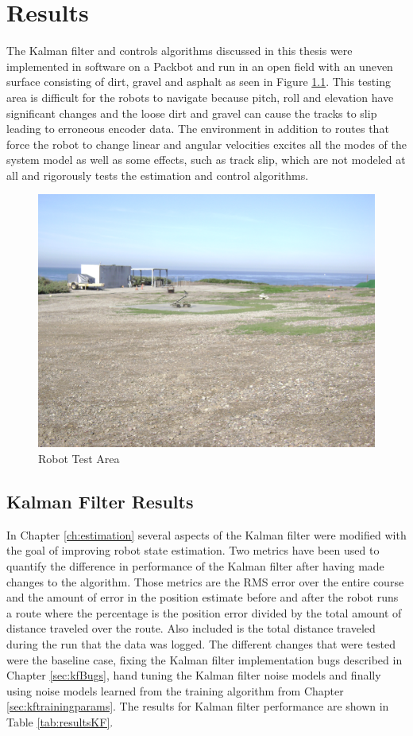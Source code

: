 \chapter{Results}
\label{ch:results}
The Kalman filter and controls algorithms discussed in this thesis were implemented in software on a Packbot and run in an open field with an uneven surface consisting of dirt, gravel and asphalt as seen in Figure \ref{fig:resultsTestArea}. This testing area is difficult for the robots to navigate because pitch, roll and elevation have significant changes and the loose dirt and gravel can cause the tracks to slip leading to erroneous encoder data. The environment in addition to routes that force the robot to change linear and angular velocities excites all the modes of the system model as well as some effects, such as track slip, which are not modeled at all and rigorously tests the estimation and control algorithms.

\begin{figure}[ht!]
	\centering
	\includegraphics[width=.75\textwidth]{images/flightFieldTestArea}
	\caption{Robot Test Area}
	\label{fig:resultsTestArea}
\end{figure}

\section{Kalman Filter Results}
\label{sec:kfResults}
In Chapter \ref{ch:estimation} several aspects of the Kalman filter were modified with the goal of improving robot state estimation. Two metrics have been used to quantify the difference in performance of the Kalman filter after having made changes to the algorithm. Those metrics are the RMS error over the entire course and the amount of error in the position estimate before and after the robot runs a route where the percentage is the position error divided by the total amount of distance traveled over the route. Also included is the total distance traveled during the run that the data was logged. The different changes that were tested were the baseline case, fixing the Kalman filter implementation bugs described in Chapter \ref{sec:kfBugs}, hand tuning the Kalman filter noise models and finally using noise models learned from the training algorithm from Chapter \ref{sec:kftrainingparams}. The results for Kalman filter performance are shown in Table \ref{tab:resultsKF}.

